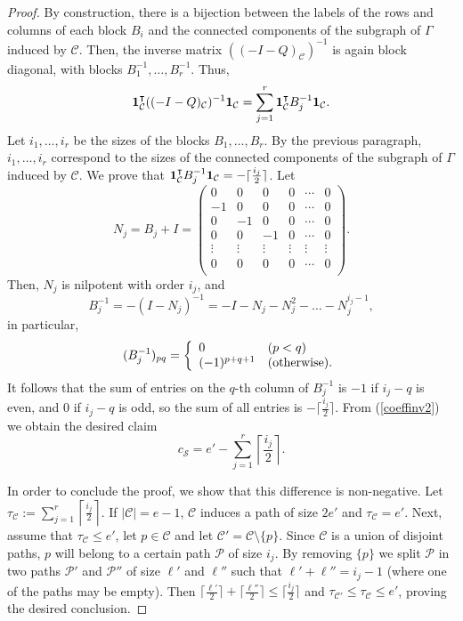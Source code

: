 \documentclass[11pt,twoside]{amsart}
\newcommand{\cS}{\mathcal{S}}
\newcommand{\cC}{\mathcal{C}}
\theoremstyle{definition}
\numberwithin{equation}{section}
\begin{document}
\begin{proof}
By construction, there is a bijection between the labels of the rows and columns of each block $B_i$ and the connected components of the subgraph of $\Gamma$ induced by $\cC$.
Then, the inverse matrix $((-I-Q)_\cC)^{-1}$ is again 
block diagonal, 
with blocks 
$B_1^{-1},\ldots,B_r^{-1}$.
 Thus, 
$${\bf 1}_\cC^\intercal ((-I-Q)_\cC)^{-1} {\bf 1}_\cC = \sum_{j=1}^r {\bf 1}_\cC^\intercal B_j^{-1} {\bf 1}_\cC.$$
Let $i_1,\ldots,i_r$ be the sizes of the blocks $B_1,\ldots,B_r$. By the previous paragraph, $i_1,\ldots,i_r$ correspond to the sizes of the connected components of the subgraph of $\Gamma$ induced by $\cC$.
We prove that ${\bf 1}_\cC^\intercal B_j^{-1} {\bf 1}_\cC = - \lceil \frac{i_j}{2} \rceil$.
Let $$N_j = B_j+I=\begin{pmatrix}
0 & 0 & 0 & 0 &\cdots & 0  \\
-1 & 0 & 0 & 0 & \cdots & 0  \\
0 & -1 & 0 & 0 & \cdots & 0  \\
0 & 0 & -1 & 0 & \cdots & 0 \\
\vdots & \vdots & \vdots & \vdots & \vdots & \vdots \\
0 & 0 & 0 & 0 & \cdots & 0 \\
\end{pmatrix}.$$ 
Then, $N_j$ is nilpotent with order $i_j$, and 
$$B_j^{-1}=-(I-N_j)^{-1}=-I-N_j-N_j^2-\ldots-N_j^{i_j-1},$$ 
in particular,
\[ (B_j^{-1})_{pq}=\left\{
\begin{array}{ll}
0  & (p < q)  \\
(-1)^{p+q+1} & ({\rm otherwise}).
\end{array}
\right.\]
It follows that the  sum of entries on the $q$-th column of $B_j^{-1}$ is $-1$ if $i_j-q$ is even, and $0$ if $i_j-q$ is odd, so the sum of all entries is $-\lceil \frac{i_j}{2} \rceil$.
From (\ref{coeffinv2}) we obtain the desired claim
 $$c_\cS = e'- \sum_{j=1}^r \left \lceil \frac{i_j}{2} \right \rceil.$$

In order to conclude the proof, we show that this difference is non-negative.
Let $\tau_\cC := \sum_{j=1}^r \left \lceil \frac{i_j}{2} \right \rceil$. 
If $|\cC| = e-1$,  $\cC$ induces a path of size $2e'$ and $\tau_\cC =e'$.
Next, assume that $\tau_\cC \le e'$, let $p \in \cC$ and let $\cC'= \cC \setminus \{p\}$. 
Since $\cC$ is a union of disjoint paths, $p$ will belong to a certain path $\mathcal{P}$  of size $i_j$. 
By removing $\{p\}$ we split $\mathcal{P}$ in two paths $\mathcal{P}'$ and $\mathcal{P}''$ of size $\ell'$ and $\ell''$ such that $\ell'+\ell''=i_j-1$ (where one of the paths may be empty). Then $\lceil \frac{\ell'}{2}\rceil +  \lceil \frac{\ell''}{2}\rceil \le \lceil \frac{i_j}{2} \rceil$ and $\tau_{\cC'} \le \tau_\cC \le e'$, 
proving the desired conclusion.
\end{proof}
\end{document}
